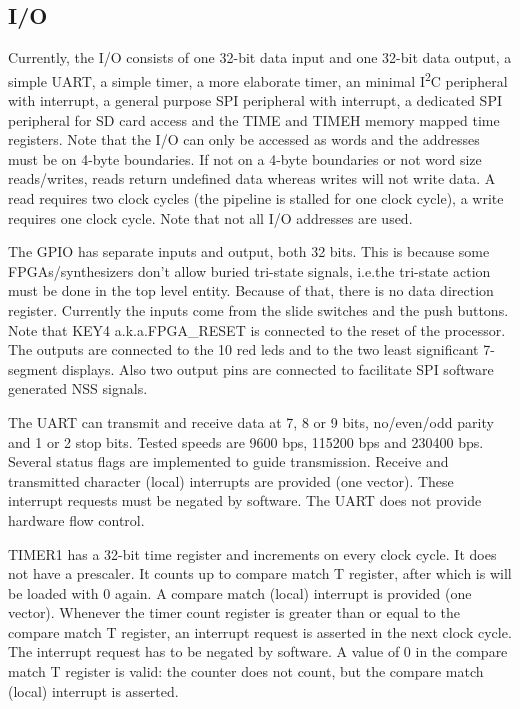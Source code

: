 \documentclass[12pt]{article}
\begin{document}
\subsection{I/O}
\label{sec/io}
Currently, the I/O consists of one 32-bit data input and one 32-bit data output, a simple UART, a simple timer, a more elaborate timer, an minimal I\textsuperscript{2}C peripheral with interrupt, a general purpose SPI peripheral with interrupt, a dedicated SPI peripheral for SD card access and the TIME and TIMEH memory mapped time registers. Note that the I/O can only be accessed as words and the addresses must be on 4-byte boundaries. If not on a 4-byte boundaries or not word size reads/writes, reads return undefined data whereas writes will not write data. A read requires two clock cycles (the pipeline is stalled for one clock cycle), a write requires one clock cycle. Note that not all I/O addresses are used.

The GPIO has separate inputs and output, both 32 bits. This is because some FPGAs/synthesizers don't allow buried tri-state signals, i.e.\@ the tri-state action must be done in the top level entity. Because of that, there is no data direction register. Currently the inputs come from the slide switches and the push buttons. Note that KEY4 a.k.a.\@ FPGA\_RESET is connected to the reset of the processor. The outputs are connected to the 10 red leds and to the two least significant 7-segment displays. Also two output pins are connected to facilitate SPI software generated NSS signals.

The UART can transmit and receive data at 7, 8 or 9 bits, no/even/odd parity and 1 or 2 stop bits. Tested speeds are 9600 bps, 115200 bps and 230400 bps. Several status flags are implemented to guide transmission. Receive and transmitted character (local) interrupts are provided (one vector). These interrupt requests must be negated by software. The UART does not provide hardware flow control.

TIMER1 has a 32-bit time register and increments on every clock cycle. It does not have a prescaler. It counts up to compare match T register, after which is will be loaded with 0 again. A compare match (local) interrupt is provided (one vector). Whenever the timer count register is greater than or equal to the compare match T register, an interrupt request is asserted in the next clock cycle. The interrupt request has to be negated by software. A value of 0 in the compare match T register is valid: the counter does not count, but the compare match (local) interrupt is asserted.
\end{document}
